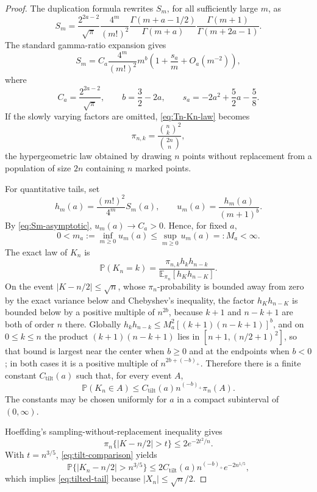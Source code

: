 \documentclass[11pt,a4paper]{amsart}
\numberwithin{equation}{section}
\theoremstyle{plain}
\theoremstyle{definition}
\newcommand{\E}{\mathbb E}
\begin{document}
\begin{proof}
The duplication formula rewrites \(S_m\), for all sufficiently large \(m\), as
\begin{equation}\label{eq:Sm-gamma-ratio}
 S_m=\frac{2^{2a-2}}{\sqrt\pi}\frac{4^m}{(m!)^2}
 \frac{\Gamma(m+a-1/2)}{\Gamma(m+a)}
 \frac{\Gamma(m+1)}{\Gamma(m+2a-1)}.
\end{equation}
The standard gamma-ratio expansion \cite[\S5.11(iii)]{NISTDLMFGamma} gives
\begin{equation}\label{eq:Sm-asymptotic}
 S_m=C_a\frac{4^m}{(m!)^2}m^b
 \left(1+\frac{s_a}{m}+O_a(m^{-2})\right),
\end{equation}
where
\[
 C_a=\frac{2^{2a-2}}{\sqrt\pi},\qquad
 b=\frac32-2a,\qquad
 s_a=-2a^2+\frac52a-\frac58.
\]
If the slowly varying factors are omitted, \eqref{eq:Tn-Kn-law} becomes
\[
 \pi_{n,k}=\frac{\binom nk^2}{\binom{2n}n},
\]
the hypergeometric law obtained by drawing \(n\) points without replacement
from a population of size \(2n\) containing \(n\) marked points.

For quantitative tails, set
\[
 h_m(a)=\frac{(m!)^2}{4^m}S_m(a),
 \qquad
 u_m(a)=\frac{h_m(a)}{(m+1)^b}.
\]
By \eqref{eq:Sm-asymptotic}, \(u_m(a)\to C_a>0\).  Hence, for fixed \(a\),
\[
 0<m_a:=\inf_{m\ge0}u_m(a)
 \le\sup_{m\ge0}u_m(a)=:M_a<\infty.
\]
The exact law of \(K_n\) is
\[
 \mathbb P(K_n=k)
 =\frac{\pi_{n,k}h_kh_{n-k}}
 {\E_{\pi_n}[h_Kh_{n-K}]}.
\]
On the event \(|K-n/2|\le\sqrt n\), whose \(\pi_n\)-probability is bounded
away from zero by the exact variance below and Chebyshev's inequality, the
factor \(h_Kh_{n-K}\) is bounded below by a positive multiple of \(n^{2b}\),
because \(k+1\) and \(n-k+1\) are both of order \(n\) there.  Globally
\(h_kh_{n-k}\le M_a^2[(k+1)(n-k+1)]^b\), and on \(0\le k\le n\) the product
\((k+1)(n-k+1)\) lies in \([n+1,(n/2+1)^2]\), so that bound is largest near the
center when \(b\ge0\) and at the endpoints when \(b<0\); in both cases it is a
positive multiple of \(n^{2b+(-b)_+}\).  Therefore there is a finite constant
\(C_{\mathrm{tilt}}(a)\) such that, for every event \(A\),
\begin{equation}\label{eq:tilt-comparison}
 \mathbb P(K_n\in A)
 \le C_{\mathrm{tilt}}(a)n^{(-b)_+}\pi_n(A).
\end{equation}
The constants may be chosen uniformly for \(a\) in a compact subinterval of
\((0,\infty)\).

Hoeffding's sampling-without-replacement inequality
\cite[\S6]{Hoeffding1963Probability} gives
\[
 \pi_n\{|K-n/2|>t\}\le2e^{-2t^2/n}.
\]
With \(t=n^{3/5}\), \eqref{eq:tilt-comparison} yields
\[
 \mathbb P\{|K_n-n/2|>n^{3/5}\}
 \le2C_{\mathrm{tilt}}(a)n^{(-b)_+}e^{-2n^{1/5}},
\]
which implies \eqref{eq:tilted-tail} because \(|X_n|\le\sqrt n/2\).


\end{proof}
\end{document}
